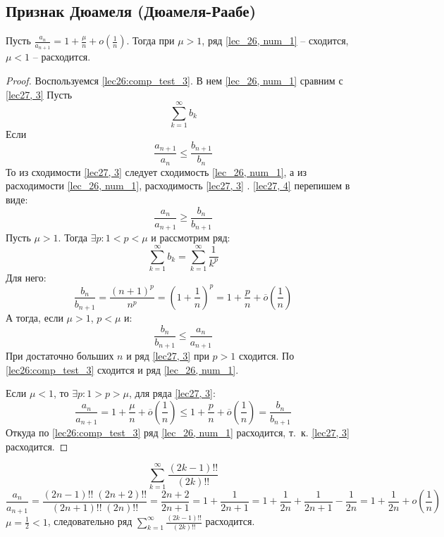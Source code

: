 \documentclass[../../main.tex]{subfiles}
\begin{document}
	\subsection{Признак Дюамеля (Дюамеля-Раабе)}
	
	\begin{thm}\label{lec27,duamele_raabe}
		Пусть $\frac{a_n}{a_{n+1}} = 1 + \frac{\mu}{n} + o\left( \frac{1}{n}\right) 
		$. Тогда при $\mu > 1$, ряд \ref{lec_26, num_1} \--- сходится, $\mu < 1$ 
		\--- расходится.
		\begin{proof}
			Воспользуемся \ref{lec26:comp_test_3}. В нем \ref{lec_26, num_1} сравним с 
			\ref{lec27, 3}
			Пусть \begin{equation} \label{lec27, 3}
			\sum_{k = 1}^{\infty} b_k
			\end{equation}
			Если \begin{equation}\label{lec27, 4}
			\frac{a_{n+1}}{a_n} \le \frac{b_{n+1}}{b_n}
			\end{equation}
			То из сходимости \ref{lec27, 3} следует сходимость \ref{lec_26, num_1}, а 
			из расходимости  \ref{lec_26, num_1}, расходимость \ref{lec27, 3} . 
			\ref{lec27, 4} перепишем в виде:
			\begin{equation} \label{lec27,(5)}
			\frac{a_n}{a_{n+1}} \ge \frac{b_n}{b_{n+1}}
			\end{equation}
			Пусть $\mu > 1$. Тогда $\exists p :  1 < p < \mu$ и рассмотрим ряд:
			\[  \sum_{k=1}^{\infty} b_k = \sum_{k=1}^{\infty} \frac{1}{k^p}    \]
			Для него:
			\[ \frac{b_n}{b_{n+1}} = \frac{(n+1)^p}{n^p} = \left( 1 + \frac{1}{n} 
			\right)^p = 1 + \frac{p}{n} + \overline{o}\left( \frac{1}{n} \right)       
			\]
			А тогда, если $\mu > 1$, $p < \mu$ и:
			\[ \frac{b_n}{b_{n+1}} \le \frac{a_n}{a_{n+1}}      \]
			При достаточно больших $n$ и ряд \ref{lec27, 3} при $p > 1$ сходится. По 
			\ref{lec26:comp_test_3} сходится и ряд \ref{lec_26, num_1}.
			
			Если $\mu < 1$, то $\exists p : 1 > p > \mu$, для ряда \ref{lec27, 3}:
			\[  \frac{a_n}{a_{n+1}} = 1 + \frac{\mu}{n} + \overline{o}\left( 
			\frac{1}{n} \right) \le  1 + \frac{p}{n} + \overline{o}\left( \frac{1}{n} 
			\right) = \frac{b_n}{b_{n+1}}                   \]
			Откуда по \ref{lec26:comp_test_3} ряд \ref{lec_26, num_1} расходится, т.~к. 
			\ref{lec27, 3} расходится.
		\end{proof}
	\end{thm}	
	
	
	\begin{example}
		\[ \sum_{k=1}^{\infty} \frac{(2k-1)!!}{(2k)!!}    \]
		\[ \frac{a_n}{a_{n+1}} = \frac{ (2n-1)!! \; (2n+2)!!}{ (2n+1)!! \;  (2n)!! } 
		= \frac{2n+2}{2n+1} = 1 + \frac{1}{2n+1} = 1 + \frac{1}{2n} + \frac{1}{2n+1} 
		- \frac{1}{2n} = 1 + \frac{1}{2n} + o\left( \frac{1}{n} \right)     \]
		$\mu = \frac{1}{2} < 1$, следовательно ряд $\sum_{k=1}^{\infty} 
		\frac{(2k-1)!!}{(2k)!!}$ расходится.
		
	\end{example}	
\end{document}
